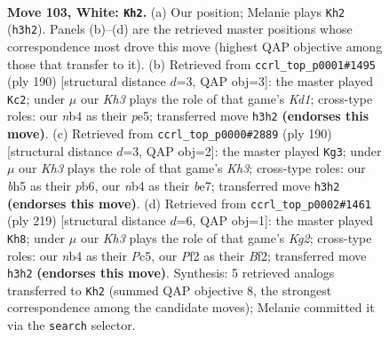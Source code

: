 \documentclass[11pt]{article}
\begin{document}
\clearpage

\begin{figure}[p]\centering
\begin{subfigure}{0.46\textwidth}\centering
\resizebox{\linewidth}{!}{%
\newchessgame
\chessboard[
  setfen={8/7k/8/7b/1n1B4/7K/5P2/8 w - - 51 103},
  showmover=false,
  pgfstyle=straightmove, color=movearrow, markmove={h3-h2}
]}
\caption{}
\end{subfigure}\hfill
\begin{subfigure}{0.46\textwidth}\centering
\resizebox{\linewidth}{!}{%
\newchessgame
\chessboard[
  setfen={8/2k5/8/3Bp3/8/4bP2/8/3K4 w - - 13 96},
  showmover=false,
  pgfstyle=straightmove, color=movearrow, markmove={d1-c2}
]}
\caption{}
\end{subfigure}
\\[4pt]
\begin{subfigure}{0.46\textwidth}\centering
\resizebox{\linewidth}{!}{%
\newchessgame
\chessboard[
  setfen={8/4b3/1p6/1P6/2B5/7K/8/6k1 w - - 5 96},
  showmover=false,
  pgfstyle=straightmove, color=movearrow, markmove={h3-g3}
]}
\caption{}
\end{subfigure}\hfill
\begin{subfigure}{0.46\textwidth}\centering
\resizebox{\linewidth}{!}{%
\newchessgame
\chessboard[
  setfen={8/6k1/8/2p2KB1/8/8/5b2/3B4 b - - 87 110},
  showmover=false,
  pgfstyle=straightmove, color=movearrow, markmove={g7-h8}
]}
\caption{}
\end{subfigure}
\caption{\textbf{Move 103, White: \texttt{Kh2}.} (a) Our position; Melanie plays \texttt{Kh2} (\texttt{h3h2}). Panels (b)--(d) are the retrieved master positions whose correspondence most drove this move (highest QAP objective among those that transfer to it). (b) Retrieved from \texttt{ccrl\_top\_p0001\#1495} (ply 190) [structural distance $d$=3, QAP obj=3]: the master played \texttt{Kc2}; under $\mu$ our \emph{Kh3} plays the role of that game's \emph{Kd1}; cross-type roles: our \emph{n}b4 as their \emph{p}e5; transferred move \texttt{h3h2} \textbf{(endorses this move)}. (c) Retrieved from \texttt{ccrl\_top\_p0000\#2889} (ply 190) [structural distance $d$=3, QAP obj=2]: the master played \texttt{Kg3}; under $\mu$ our \emph{Kh3} plays the role of that game's \emph{Kh3}; cross-type roles: our \emph{b}h5 as their \emph{p}b6, our \emph{n}b4 as their \emph{b}e7; transferred move \texttt{h3h2} \textbf{(endorses this move)}. (d) Retrieved from \texttt{ccrl\_top\_p0002\#1461} (ply 219) [structural distance $d$=6, QAP obj=1]: the master played \texttt{Kh8}; under $\mu$ our \emph{Kh3} plays the role of that game's \emph{Kg2}; cross-type roles: our \emph{n}b4 as their \emph{P}c5, our \emph{P}f2 as their \emph{B}f2; transferred move \texttt{h3h2} \textbf{(endorses this move)}. Synthesis: 5 retrieved analogs transferred to \texttt{Kh2} (summed QAP objective 8, the strongest correspondence among the candidate moves); Melanie committed it via the \texttt{search} selector.}
\label{fig:thought-m204}
\end{figure}
\end{document}

